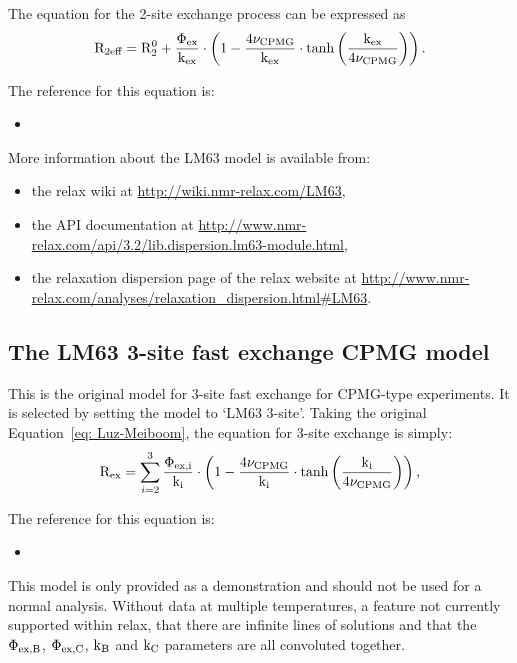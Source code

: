 The equation for the 2-site exchange process can be expressed as
\begin{equation}
    \mathrm{R}_{\textrm{2eff}} = \mathrm{R}_2^0 + \frac{\Phi_{\textrm{ex}}}{\textrm{k}_{\textrm{ex}}} \cdot \left( 1 - \frac{4\nu_{\textrm{CPMG}}}{\textrm{k}_{\textrm{ex}}} \cdot \tanh \left( \frac{\textrm{k}_{\textrm{ex}}}{4\nu_{\textrm{CPMG}}} \right) \right).
\end{equation}

The reference for this equation is:
\begin{itemize}
  \item {}
\end{itemize}

More information about the LM63 model is available from:
\begin{itemize}
  \item the relax wiki at \url{http://wiki.nmr-relax.com/LM63},
  \item the API documentation at \url{http://www.nmr-relax.com/api/3.2/lib.dispersion.lm63-module.html},
  \item the relaxation dispersion page of the relax website at \url{http://www.nmr-relax.com/analyses/relaxation\_dispersion.html#LM63}.
\end{itemize}



\subsection{The LM63 3-site fast exchange CPMG model}
\label{sect: dispersion: LM63 3-site model}

This is the original \citet{LuzMeiboom63} model for 3-site fast exchange for CPMG-type experiments.
It is selected by setting the model to `LM63 3-site'.
Taking the original Equation~\ref{eq: Luz-Meiboom}, the equation for 3-site exchange is simply:
\begin{equation}
    \mathrm{R}_{\textrm{ex}} = \sum_{i=2}^3 \frac{\Phi_{\textrm{ex,i}}}{\textrm{k}_\textrm{i}} \cdot \left( 1 - \frac{4\nu_{\textrm{CPMG}}}{\textrm{k}_\textrm{i}} \cdot \tanh \left( \frac{\textrm{k}_\textrm{i}}{4\nu_{\textrm{CPMG}}} \right) \right) ,
\end{equation}

The reference for this equation is:
\begin{itemize}
  \item {}
\end{itemize}

This model is only provided as a demonstration and should not be used for a normal analysis.
Without data at multiple temperatures, a feature not currently supported within relax, that there are infinite lines of solutions and that the $\Phi_{\textrm{ex,B}}$, $\Phi_{\textrm{ex,C}}$, $\textrm{k}_{\textrm{B}}$ and $\textrm{k}_{\textrm{C}}$ parameters are all convoluted together.

